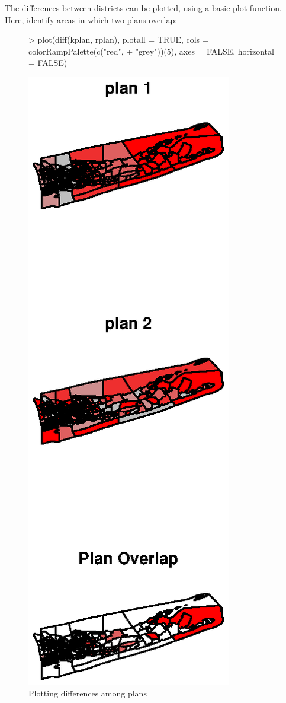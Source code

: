 \documentclass[article]{JSSstyle/jss}
\begin{document}
The differences between districts can be plotted, using a basic plot function. Here, identify areas in which two plans overlap:

  \begin{figure}[!h]
  
\begin{Schunk}
\begin{Sinput}
> plot(diff(kplan, rplan), plotall = TRUE, cols = colorRampPalette(c("red", 
+     "grey"))(5), axes = FALSE, horizontal = FALSE)
\end{Sinput}
\end{Schunk}
\includegraphics{bardJSS-plot2a}
  \caption{\label{fig:rplot2} Plotting differences among plans}
  \end{figure}
  
\end{document}
